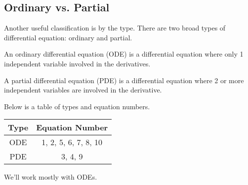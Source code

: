 \subsection{Ordinary vs. Partial}
\noindent
Another useful classification is by the type. There are two broad types of differential equation: ordinary and partial.
\begin{definition}
	An ordinary differential equation (ODE) is a differential equation where only 1 independent variable involved in the derivatives.
\end{definition}
\begin{definition}
	A partial differential equation (PDE) is a differential equation where 2 or more independent variables are involved in the derivative.
\end{definition}
\noindent
Below is a table of types and equation numbers.
\begin{table}[H]
	\centering
	\begin{tabular}{c|c}
		Type & Equation Number \\
		\hline
		ODE &  1, 2, 5, 6, 7, 8, 10 \\
		PDE & 3, 4, 9 \\
	\end{tabular}
\end{table}
\noindent
We'll work mostly with ODEs.